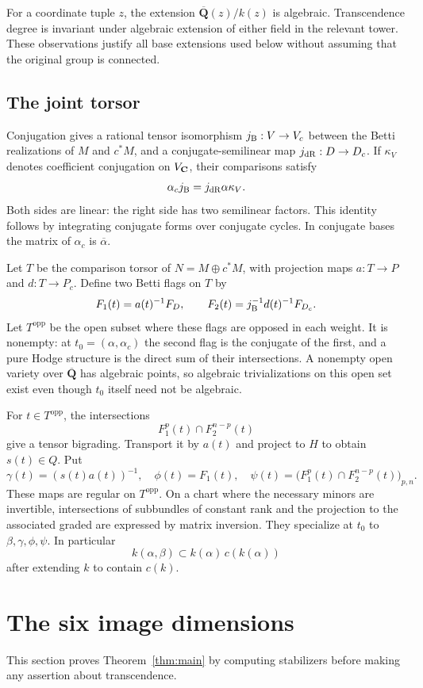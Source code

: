 \documentclass[11pt]{article}
\theoremstyle{definition}\newtheorem{definition}[theorem]{Definition}
\theoremstyle{remark}\newtheorem{remark}[theorem]{Remark}
\newcommand{\Qb}{\overline{\mathbf Q}}\newcommand{\Fp}{\mathbf F_p}
\begin{document}
For a coordinate tuple $z$, the extension $\Qb(z)/k(z)$ is algebraic. Transcendence degree is invariant under algebraic extension of either field in the relevant tower. These observations justify all base extensions used below without assuming that the original group is connected.

\subsection{The joint torsor}
Conjugation gives a rational tensor isomorphism $j_{\mathrm B}:V\to V_c$ between the Betti realizations of $M$ and $c^*M$, and a conjugate-semilinear map $j_{\mathrm{dR}}:D\to D_c$. If $\kappa_V$ denotes coefficient conjugation on $V_{\mathbf C}$, their comparisons satisfy
\[
                  \alpha_c j_{\mathrm B}=j_{\mathrm{dR}}\alpha\kappa_V.
\]
Both sides are linear: the right side has two semilinear factors. This identity follows by integrating conjugate forms over conjugate cycles. In conjugate bases the matrix of $\alpha_c$ is $\overline\alpha$.

Let $T$ be the comparison torsor of $N=M\oplus c^*M$, with projection maps $a:T\to P$ and $d:T\to P_c$. Define two Betti flags on $T$ by
\[
 F_1(t)=a(t)^{-1}F_D,\qquad
 F_2(t)=j_{\mathrm B}^{-1}d(t)^{-1}F_{D_c}.
\]
Let $T^{\mathrm{opp}}$ be the open subset where these flags are opposed in each weight. It is nonempty: at $t_0=(\alpha,\alpha_c)$ the second flag is the conjugate of the first, and a pure Hodge structure is the direct sum of their intersections. A nonempty open variety over $\Qb$ has algebraic points, so algebraic trivializations on this open set exist even though $t_0$ itself need not be algebraic.

For $t\in T^{\mathrm{opp}}$, the intersections
\[
                 F_1^p(t)\cap F_2^{n-p}(t)
\]
give a tensor bigrading. Transport it by $a(t)$ and project to $H$ to obtain $s(t)\in Q$. Put
\[
 \gamma(t)=(s(t)a(t))^{-1},\quad
 \phi(t)=F_1(t),\quad
 \psi(t)=\bigl(F_1^p(t)\cap F_2^{n-p}(t)\bigr)_{p,n}.
\]
These maps are regular on $T^{\mathrm{opp}}$. On a chart where the necessary minors are invertible, intersections of subbundles of constant rank and the projection to the associated graded are expressed by matrix inversion. They specialize at $t_0$ to $\beta,\gamma,\phi,\psi$. In particular
\[
             k(\alpha,\beta)\subset k(\alpha)\,c(k(\alpha))
\]
after extending $k$ to contain $c(k)$.

\section{The six image dimensions}\label{sec:images}
This section proves Theorem~\ref{thm:main} by computing stabilizers before making any assertion about transcendence.
\end{document}
